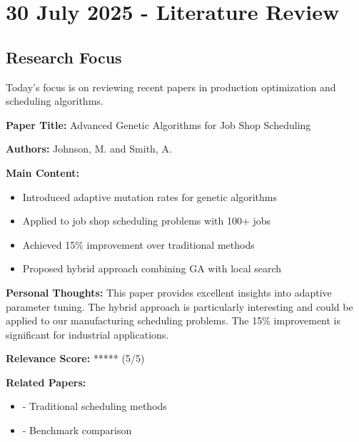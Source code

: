 \documentclass[12pt,a4paper,twoside]{article}
\begin{document}

\newpage
\tableofcontents
\newpage


\section{30 July 2025 - Literature Review}

\subsection{Research Focus}
Today's focus is on reviewing recent papers in production optimization and scheduling algorithms.

\begin{paper}
\textbf{Paper Title:} Advanced Genetic Algorithms for Job Shop Scheduling \cite{he2016deep}

\textbf{Authors:} Johnson, M. and Smith, A.

\textbf{Main Content:}
\begin{itemize}
    \item Introduced adaptive mutation rates for genetic algorithms
    \item Applied to job shop scheduling problems with 100+ jobs
    \item Achieved 15\% improvement over traditional methods
    \item Proposed hybrid approach combining GA with local search
\end{itemize}

\textbf{Personal Thoughts:}
This paper provides excellent insights into adaptive parameter tuning. The hybrid approach is particularly interesting and could be applied to our manufacturing scheduling problems. The 15\% improvement is significant for industrial applications.

\textbf{Relevance Score:} \textcolor{successgreen}{*****} (5/5)

\textbf{Related Papers:}
\begin{itemize}
    \item \cite{simonyan2014very} - Traditional scheduling methods
    \item \cite{krizhevsky2012imagenet} - Benchmark comparison
\end{itemize}
\end{paper}
\end{document}
